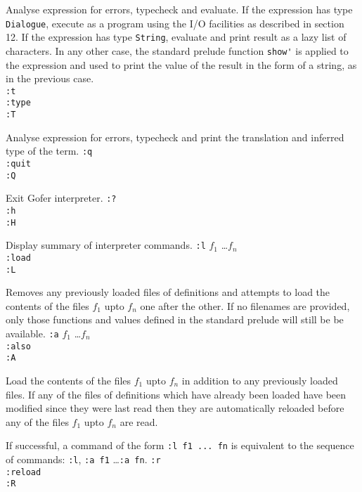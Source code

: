              Analyse expression for errors, typecheck and evaluate.  If
             the expression has type \verb"Dialogue",  execute  as  a  program
             using the I/O facilities as described in section  12.   If
             the expression has type \verb"String", evaluate and print  result
             as a lazy list of characters.   In  any  other  case,  the
             standard  prelude  function  \verb"show'"  is  applied   to   the
             expression and used to print the value of  the  result  in
             the form of a string, as in the previous case.\\
\IT
\verb":t"  \\
\verb":type"  \\
\verb":T"

             Analyse expression for errors,  typecheck  and  print  the
             translation and inferred type of the term.
\IT
\verb":q"\\
\verb":quit"\\
\verb":Q"

             Exit Gofer interpreter.
\IT
\verb":?"\\
\verb":h"\\
\verb":H"

             Display summary of interpreter commands.
\IT
\verb":l" $f_1$ \dots $f_n$\\
\verb":load"\\
\verb":L"

             Removes any previously loaded  files  of  definitions  and
             attempts to load the contents of the files $f_1$ upto $f_n$  one
             after the other.
             If no filenames are provided,
             only
             those functions and values defined in the standard prelude
             will still be be available.
\IT
\verb":a" $f_1$ \dots $f_n$  \\
\verb":also"\\
\verb":A"

             Load the contents of the files $f_1$ upto $f_n$ in  addition  to
             any previously loaded files.   If  any  of  the  files  of
             definitions which  have  already  been  loaded  have  been
             modified since they were last  read  then  they  are
             automatically reloaded before any of the files $f_1$ upto  $f_n$
             are read.

             If successful, a command of  the  form  \verb":l f1 ... fn"  is
             equivalent to the sequence of commands:
             \verb":l", \verb":a f1" \dots \verb":a fn".
\IT
\verb":r"\\
\verb":reload"\\
\verb":R"

